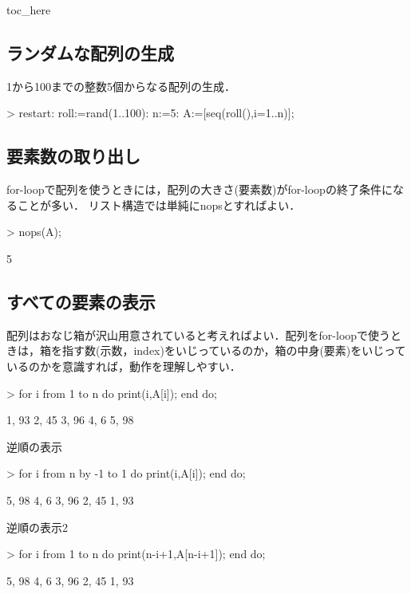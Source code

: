 \ifHIKI
{{toc_here}}
\else
\fi
\subsection{ランダムな配列の生成}
1から100までの整数5個からなる配列の生成．
\begin{MapleInput}
> restart: 
  roll:=rand(1..100): 
  n:=5: 
  A:=[seq(roll(),i=1..n)];
\end{MapleInput}
\begin{MapleError}
                             [93, 45, 96, 6, 98]
\end{MapleError}

\subsection{要素数の取り出し}
for-loopで配列を使うときには，配列の大きさ(要素数)がfor-loopの終了条件になることが多い．
リスト構造では単純にnopsとすればよい．
\begin{MapleInput}
> nops(A);
\end{MapleInput}
\begin{MapleError}
                                      5
\end{MapleError}

\subsection{すべての要素の表示}
配列はおなじ箱が沢山用意されていると考えればよい．配列をfor-loopで使うときは，箱を指す数(示数，index)をいじっているのか，箱の中身(要素)をいじっているのかを意識すれば，動作を理解しやすい．
\begin{MapleInput}
> for i from 1 to n do 
    print(i,A[i]); 
  end do;
\end{MapleInput}
\begin{MapleError}
                                    1, 93
                                    2, 45
                                    3, 96
                                     4, 6
                                    5, 98
\end{MapleError}
逆順の表示
\begin{MapleInput}
> for i from n by -1 to 1 do
    print(i,A[i]); 
  end do;
\end{MapleInput}
\begin{MapleError}
                                    5, 98
                                     4, 6
                                    3, 96
                                    2, 45
                                    1, 93
\end{MapleError}
逆順の表示2
\begin{MapleInput}
> for i from 1 to n do
    print(n-i+1,A[n-i+1]); 
  end do;
\end{MapleInput}
\begin{MapleError}
                                    5, 98
                                     4, 6
                                    3, 96
                                    2, 45
                                    1, 93
\end{MapleError}
